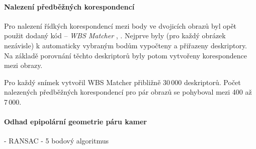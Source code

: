 \documentclass[11pt,oneside,a4paper,pdftex]{article}   %
\begin{document}
\paragraph{Nalezení předběžných korespondencí} Pro nalezení řídkých korespondencí mezi body ve
dvojicích obrazů byl opět použit dodaný kód -- \emph{WBS Matcher} \cite{code_repo},
\cite{WBS_Matcher}.  Nejprve byly (pro každý obrázek nezávisle) k automaticky vybraným
 bodům vypočteny a přiřazeny deskriptory. Na základě porovnání těchto deskriptorů byly
potom vytvořeny korespondence mezi obrazy.

Pro každý snímek vytvořil WBS Matcher přibližně 30\,000 deskriptorů. Počet nalezených předběžných
korespondencí pro pár obrazů se pohyboval mezi 400 až 7\,000.


\paragraph{Odhad epipolární geometrie páru kamer}

- RANSAC \cite{RansacOverview}
- 5 bodový algoritmus \cite{stewenius-engels-nister-isprsj-2006}

%
\end{document}
